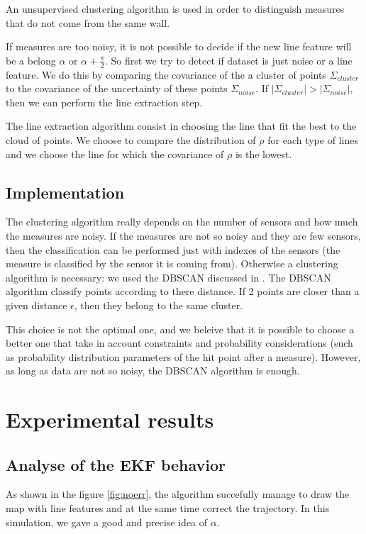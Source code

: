 \documentclass[a4paper,12pt]{article}
\begin{document}
An unsupervised clustering algorithm is used in order to distinguish measures that do not come from the same wall.

If measures are too noisy, it is not possible to decide if the new line feature will be a belong $\alpha$ or $\alpha + \frac{\pi}{2}$. So first we try to detect if dataset is just noise or a line feature. We do this by comparing the covariance of the a cluster of points $\Sigma_{cluster}$ to the covariance of the uncertainty of these points $\Sigma_{noise}$. If  $\left | \Sigma_{cluster} \right | > \left | \Sigma_{noise} \right |$, then we can perform the line extraction step.

The line extraction algorithm consist in choosing the line that fit the best to the cloud of points. We choose to compare the distribution of $\rho$ for each type of lines and we choose the line for which the covariance of $\rho$ is the lowest.

\subsection{Implementation}

The clustering algorithm really depends on the number of sensors and how much the measures are noisy. If the measures are not so noisy and they are few sensors, then the classification can be performed just with indexes of the sensors (the measure is classified by the sensor it is coming from).
Otherwise a clustering algorithm is necessary: we used the DBSCAN discussed in \cite{ester1996density}. The DBSCAN algorithm classify points according to there distance. If 2 points are closer than a given distance $\epsilon$, then they belong to the same cluster.

This choice is not the optimal one, and we beleive that it is possible to choose a better one that take in account constraints and probability considerations (such as probability distribution parameters of the hit point after a measure).
However, as long as data are not so noisy, the DBSCAN algorithm is enough.

\section{Experimental results}
\label{sec:exps}


\subsection{Analyse of the EKF behavior}
As shown in the figure \ref{fig:noerr}, the algorithm succefully manage to draw the map with line features and at the same time correct the trajectory. 
In this simulation, we gave a good and precise idea of $\alpha$. 
\end{document}
